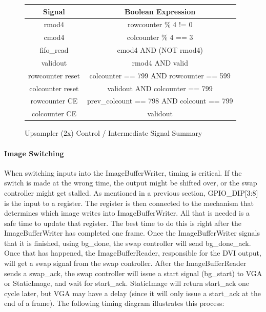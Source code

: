 \documentclass[12pt]{article}
\begin{document}
\begin{figure}
    \begingroup
    \tiny
\caption{ Upsampler (2x) Control / Intermediate Signal Summary } \label{wrap-tab:3}
\noindent \begin{tabular}{ c | c } \toprule
Signal & Boolean Expression \\\toprule
rmod4 & rowcounter \% 4 != 0 \\
cmod4 & colcounter \% 4 == 3 \\
fifo\_read & cmod4 AND (NOT rmod4) \\
validout & rmod4 AND valid \\
rowcounter reset & colcounter == 799 AND rowcounter == 599 \\
colcounter reset & validout AND colcounter == 799 \\
rowcounter CE & prev\_colcount == 798 AND colcount == 799 \\
colcounter CE & validout \\
\end{tabular}

\endgroup
\end{figure}



\paragraph{Image Switching}
When switching inputs into the ImageBufferWriter, timing is critical. If the switch is made at the wrong time, the output might be shifted over, or the swap controller might get stalled. As mentioned in a previous section, GPIO\_DIP[3:8] is the input to a register. The register is then connected to the mechanism that determines which image writes into ImageBufferWriter. All that is needed is a safe time to update that register. The best time to do this is right after the ImageBufferWriter has completed one frame. Once the ImageBufferWriter signals that it is finished, using bg\_done, the swap controller will send bg\_done\_ack. Once that has happened, the ImageBufferReader, responsible for the DVI output, will get a swap signal from the swap controller. After the ImageBufferReader sends a swap\_ack, the swap controller will issue a start signal (bg\_start) to VGA or StaticImage, and wait for start\_ack. StaticImage will return start\_ack one cycle later, but VGA may have a delay (since it will only issue a start\_ack at the end of a frame). The following timing diagram illustrates this process:
\end{document}
